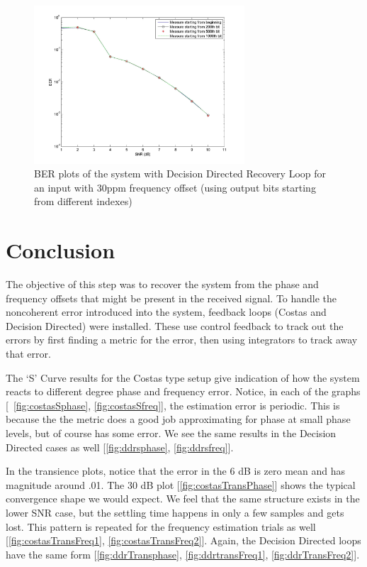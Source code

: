 \documentclass[]{article}
\begin{document}
\begin{figure}[H]
\centering
\hspace*{-2cm}\includegraphics[width=0.7\textwidth]{qpBERfo_ddr2.jpg}
\caption{BER plots of the system with Decision Directed Recovery Loop for an input with 30ppm frequency offset (using output bits starting from different indexes) \label{fig:ddrBERFreq2}}
\end{figure}

\newpage
\section{Conclusion}
\label{sec:conc}

The objective of this step was to recover the system from the phase and frequency offsets that might be present in the received signal. To handle the noncoherent error introduced into the system, feedback loops (Costas and Decision Directed) were installed. These use control feedback to track out the errors by first finding a metric for the error, then using integrators to track away that error. 

The `S' Curve results for the Costas type setup give indication of how the system reacts to different degree phase and frequency error.  Notice, in each of the graphs [~\ref{fig:costasSphase}, \ref{fig:costasSfreq}], the estimation error is periodic.  This is because the the metric does a good job approximating for phase at small phase levels, but of course has some error.  We see the same results in the Decision Directed cases as well [\ref{fig:ddrsphase}, \ref{fig:ddrsfreq}].

In the transience plots, notice that the error in the 6 dB is zero mean and has magnitude around .01.  The 30 dB plot [\ref{fig:costasTransPhase}]  shows the typical convergence shape we would expect.  We feel that the same structure exists in the lower SNR case, but the settling time happens in only a few samples and gets lost.  This pattern is repeated for the frequency estimation trials as well [\ref{fig:costasTransFreq1}, \ref{fig:costasTransFreq2}].  Again, the Decision Directed loops have the same form [\ref{fig:ddrTransphase}, \ref{fig:ddrtransFreq1}, \ref{fig:ddrTransFreq2}].
\end{document}
